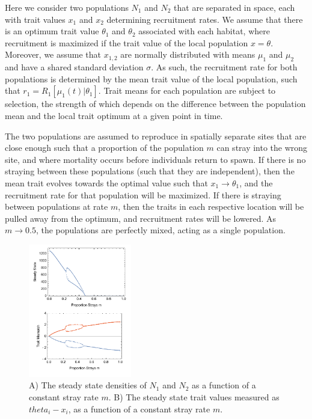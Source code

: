 \documentclass[twocolumn,preprintnumbers,amsmath,amssymb,superscriptaddress]{revtex4}
\begin{document}
Here we consider two populations $N_1$ and $N_2$ that are separated in space, each with trait values $x_1$ and $x_2$ determining recruitment rates.
We assume that there is an optimum trait value $\theta_1$ and $\theta_2$ associated with each habitat, where recruitment is maximized if the trait value of the local population $x = \theta$.
Moreover, we assume that $x_{1,2}$ are normally distributed with means $\mu_1$ and $\mu_2$ and have a shared standard deviation $\sigma$.
As such, the recruitment rate for both populations is determined by the mean trait value of the local population, such that $r_1 = R_1[\mu_1(t)|\theta_1]$.
Trait means for each population are subject to selection, the strength of which depends on the difference between the population mean and the local trait optimum at a given point in time.

The two populations are assumed to reproduce in spatially separate sites that are close enough such that a proportion of the population $m$ can stray into the wrong site, and where mortality occurs before individuals return to spawn.
If there is no straying between these populations (such that they are independent), then the mean trait evolves towards the optimal value such that $x_1 \rightarrow \theta_1$, and the recruitment rate for that population will be maximized.
If there is straying between populations at rate $m$, then the traits in each respective location will be pulled away from the optimum, and recruitment rates will be lowered.
As $m \rightarrow 0.5$, the populations are perfectly mixed, acting as a single population.

\begin{figure}
\centering
\includegraphics[width=0.4\textwidth]{figs/fig_Density.pdf}
\caption{
A) The steady state densities of $N_1$ and $N_2$ as a function of a constant stray rate $m$.
B) The steady state trait values measured as $theta_i - x_i$, as a function of a constant stray rate $m$. 
} \label{fig:traj}
\end{figure}
\end{document}
